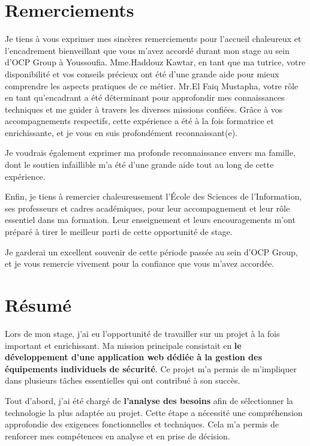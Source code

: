 \documentclass[a4paper,12pt]{report}
\begin{document}
\chapter*{Remerciements}
 Je tiens à vous exprimer mes sincères remerciements pour l’accueil chaleureux et l’encadrement bienveillant que vous m’avez accordé durant mon stage au sein d’OCP Group à Youssoufia. Mme.Haddouz Kawtar, en tant que ma tutrice, votre disponibilité et vos conseils précieux ont été d’une grande aide pour mieux comprendre les aspects pratiques de ce métier. Mr.El Faiq Mustapha, votre rôle en tant qu’encadrant a été déterminant pour approfondir mes connaissances techniques et me guider à travers les diverses missions confiées. Grâce à vos accompagnements respectifs, cette expérience a été à la fois formatrice et enrichissante, et je vous en suis profondément reconnaissant(e).

Je voudrais également exprimer ma profonde reconnaissance envers ma famille, dont le soutien infaillible m’a été d’une grande aide tout au long de cette expérience.

Enfin, je tiens à remercier chaleureusement l’École des Sciences de l’Information, ses professeurs et cadres académiques, pour leur accompagnement et leur rôle essentiel dans ma formation. Leur enseignement et leurs encouragements m’ont préparé à tirer le meilleur parti de cette opportunité de stage.

Je garderai un excellent souvenir de cette période passée au sein d'OCP Group, et je vous remercie vivement pour la confiance que vous m’avez accordée.

\chapter*{Résumé}

Lors de mon stage, j'ai eu l'opportunité de travailler sur un projet à la fois important et enrichissant. Ma mission principale consistait en \textbf{le développement d'une application web dédiée à la gestion des équipements individuels de sécurité}. Ce projet m'a permis de m'impliquer dans plusieurs tâches essentielles qui ont contribué à son succès.

Tout d'abord, j'ai été chargé de \textbf{l'analyse des besoins} afin de sélectionner la technologie la plus adaptée au projet. Cette étape a nécessité une compréhension approfondie des exigences fonctionnelles et techniques. Cela m'a permis de renforcer mes compétences en analyse et en prise de décision.
\end{document}
